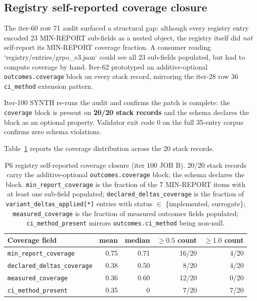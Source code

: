 \subsection{Registry self-reported coverage closure}
\label{sec:p6-coverage-closure}

The iter-60 row 71 audit surfaced a structural gap: although every
registry entry encoded 23 MIN-REPORT sub-fields as a nested object, the
registry itself did \emph{not} self-report its MIN-REPORT coverage
fraction. A consumer reading `registry/entries/grpo_e3.json` could see
all 23 sub-fields populated, but had to compute coverage by hand. Iter-62
prototyped an additive-optional \texttt{outcomes.coverage} block on
every stack record, mirroring the iter-28 row 36 \texttt{ci\_method}
extension pattern.

Iter-100 SYNTH re-runs the audit and confirms the patch is complete: the
\texttt{coverage} block is present on \textbf{20/20 stack records} and
the schema declares the block as an optional property. Validator exit
code 0 on the full 35-entry corpus confirms zero schema violations.

Table~\ref{tab:p6-coverage-closure} reports the coverage distribution
across the 20 stack records.

\begin{table}[ht]
\centering
\small
\caption{P6 registry self-reported coverage closure (iter 100 JOB B).
20/20 stack records carry the additive-optional \texttt{outcomes.coverage}
block; the schema declares the block. \texttt{min\_report\_coverage}
is the fraction of the 7 MIN-REPORT items with at least one sub-field
populated; \texttt{declared\_deltas\_coverage} is the fraction of
\texttt{variant\_deltas\_applied[*]} entries with status $\in$ \{implemented,
surrogate\}; \texttt{measured\_coverage} is the fraction of measured
outcomes fields populated; \texttt{ci\_method\_present} mirrors
\texttt{outcomes.ci\_method} being non-null.}
\label{tab:p6-coverage-closure}
\begin{tabular}{l r r r r}
\toprule
Coverage field & mean & median & $\geq 0.5$ count & $\geq 1.0$ count \\
\midrule
\texttt{min\_report\_coverage}    & 0.75 & 0.71 & 16/20 & 4/20 \\
\texttt{declared\_deltas\_coverage} & 0.38 & 0.50 & 8/20  & 4/20 \\
\texttt{measured\_coverage}      & 0.36 & 0.60 & 12/20 & 0/20 \\
\texttt{ci\_method\_present}     & 0.35 & 0    & 7/20  & 7/20 \\
\bottomrule
\end{tabular}
\end{table}

